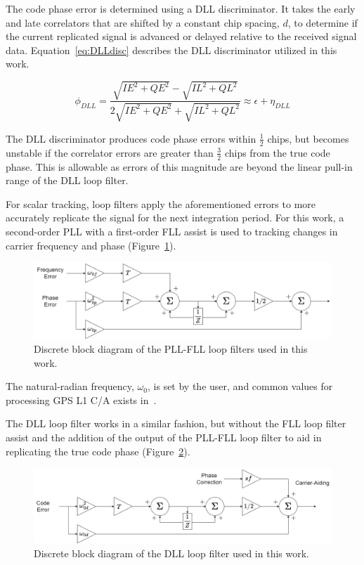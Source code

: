 The code phase error is determined using a DLL discriminator. It takes the early and late correlators that are shifted by a constant chip spacing, \(d\), to determine if the current replicated signal is advanced or delayed relative to the received signal data. Equation~\ref{eq:DLLdisc} describes the DLL discriminator utilized in this work.

\begin{equation}\label{eq:DLLdisc}
    \phi_{DLL} = \frac{\sqrt{IE^2 + QE^2} - \sqrt{IL^2 + QL^2}}{2 \sqrt{IE^2 + QE^2} + \sqrt{IL^2 + QL^2}} \approx \epsilon + \eta_{DLL}
\end{equation}

The DLL discriminator produces code phase errors within \(\frac{1}{2}\) chips, but becomes unstable if the correlator errors are greater than \(\frac{3}{2}\) chips from the true code phase. This is allowable as errors of this magnitude are beyond the linear pull-in range of the DLL loop filter.

For scalar tracking, loop filters apply the aforementioned errors to more accurately replicate the signal for the next integration period. For this work, a second-order PLL with a first-order FLL assist is used to tracking changes in carrier frequency and phase (Figure~\ref{fig:PLL}).

\begin{figure}[!ht]\label{fig:PLL}
    \centering
    \includegraphics[width=\linewidth]{Figures/PLL.png}
    \caption{Discrete block diagram of the PLL-FLL loop filters used in this work.}
\end{figure}

The natural-radian frequency, \(\omega_0\), is set by the user, and common values for processing GPS L1 C/A exists in~\cite{kaplanUnderstandingGPSPrinciples2006}.

The DLL loop filter works in a similar fashion, but without the FLL loop filter assist and the addition of the output of the PLL-FLL loop filter to aid in replicating the true code phase (Figure~\ref{fig:DLL}).

\begin{figure}[!ht]\label{fig:DLL}
    \centering
    \includegraphics[width=\linewidth]{Figures/DLL.png}
    \caption{Discrete block diagram of the DLL loop filter used in this work.}
\end{figure}

